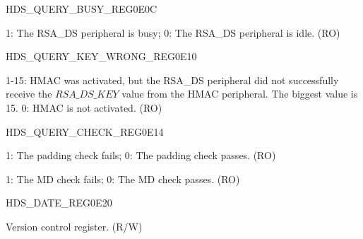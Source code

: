 \begin{register}{H}{DS\_QUERY\_BUSY\_REG}{\hexprefix{}0E0C}\label{regdesc:DSQUERYBUSYREG}
%
%
\regnewline%
\begin{regdesc}\begin{reglist}
\item [DS\_QUERY\_BUSY] 1: The RSA\_DS peripheral is busy; 0: The RSA\_DS peripheral is idle. (RO)
\end{reglist}\end{regdesc}
\end{register}



\begin{register}{H}{DS\_QUERY\_KEY\_WRONG\_REG}{\hexprefix{}0E10}\label{regdesc:DSQUERYKEYWRONGREG}
%
%
\regnewline%
\begin{regdesc}\begin{reglist}
\item [DS\_QUERY\_KEY\_WRONG] 1-15: HMAC was activated, but the RSA\_DS peripheral did not successfully receive the \begin{math}RSA\_DS\_KEY\end{math} value from the HMAC peripheral. The biggest value is 15. 0: HMAC is not activated. (RO)
\end{reglist}\end{regdesc}
\end{register}




\begin{register}{H}{DS\_QUERY\_CHECK\_REG}{\hexprefix{}0E14}\label{regdesc:DSQUERYCHECKREG}
%
%
%
\regnewline%
\begin{regdesc}\begin{reglist}
\item [DS\_PADDING\_BAD] 1: The padding check fails; 0: The padding check passes. (RO)
\item [DS\_MD\_ERROR] 1: The MD check fails; 0: The MD check passes. (RO)
\end{reglist}\end{regdesc}
\end{register}




\begin{register}{H}{DS\_DATE\_REG}{\hexprefix{}0E20}\label{regdesc:DSDATEREG}
%
%
\regnewline%
\begin{regdesc}\begin{reglist}
\item [DS\_DATE] Version control register. (R/W)
\end{reglist}\end{regdesc}
\end{register}
